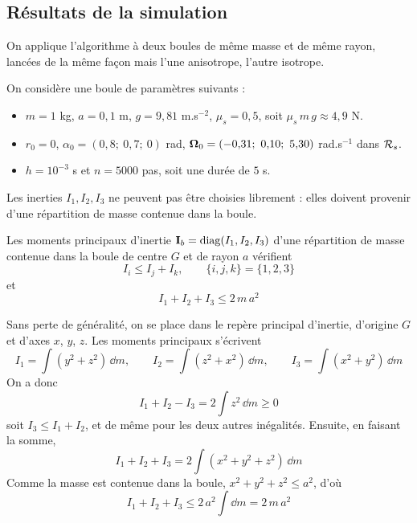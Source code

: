 
\subsection{Résultats de la simulation}

On applique l'algorithme à deux boules de même masse et de même rayon,
lancées de la même façon mais l'une anisotrope, l'autre isotrope.

\begin{hypotheses}
    On considère une boule de paramètres suivants :
    \begin{itemize}
        \item $m = 1$ kg, $a = 0{,}1$ m, $g = 9{,}81$ m.s$^{-2}$,
        $\mu_s = 0{,}5$, soit $\mu_s\,m\,g \approx 4{,}9$ N.
        \item $r_0 = 0$, $\alpha_0 = (0{,}8;\ 0{,}7;\ 0)$ rad,
        $\vect{\Omega}_0 = (-0{,}31;\ 0{,}10;\ 5{,}30)$ rad.s$^{-1}$
        dans $\mathcal{R}_{s}$.
        \item $h = 10^{-3}$ s et $n = 5000$ pas, soit une durée de $5$ s.
    \end{itemize}
\end{hypotheses}

Les inerties $I_1, I_2, I_3$ ne peuvent pas être choisies librement :
elles doivent provenir d'une répartition de masse contenue dans la
boule.

\begin{proposition}
    Les moments principaux d'inertie
    $\mathbf{I}_b = \mathrm{diag}(I_1,I_2,I_3)$ d'une répartition de
    masse contenue dans la boule de centre $G$ et de rayon $a$
    vérifient
    \[
        I_i \leq I_j + I_k,
        \qquad \{i,j,k\} = \{1,2,3\}
    \]
    et
    \[
        I_1 + I_2 + I_3 \leq 2\,m\,a^2
    \]
\end{proposition}

\begin{demonstration}
    Sans perte de généralité, on se place dans le repère principal d'inertie, d'origine $G$ et
    d'axes $x$, $y$, $z$. Les moments principaux s'écrivent
    \[
        I_1 = \int (y^2 + z^2)\,\dd m,
        \qquad
        I_2 = \int (z^2 + x^2)\,\dd m,
        \qquad
        I_3 = \int (x^2 + y^2)\,\dd m
    \]
    On a donc
    \[
        I_1 + I_2 - I_3 = 2\int z^2\,\dd m \geq 0
    \]
    soit $I_3 \leq I_1 + I_2$, et de même pour les deux autres
    inégalités. Ensuite, en faisant la somme,
    \[
        I_1 + I_2 + I_3 = 2\int (x^2 + y^2 + z^2)\,\dd m
    \]
    Comme la masse est contenue dans la boule,
    $x^2 + y^2 + z^2 \leq a^2$, d'où
    \[
        I_1 + I_2 + I_3 \leq 2\,a^2\int \dd m = 2\,m\,a^2
    \]
\end{demonstration}
